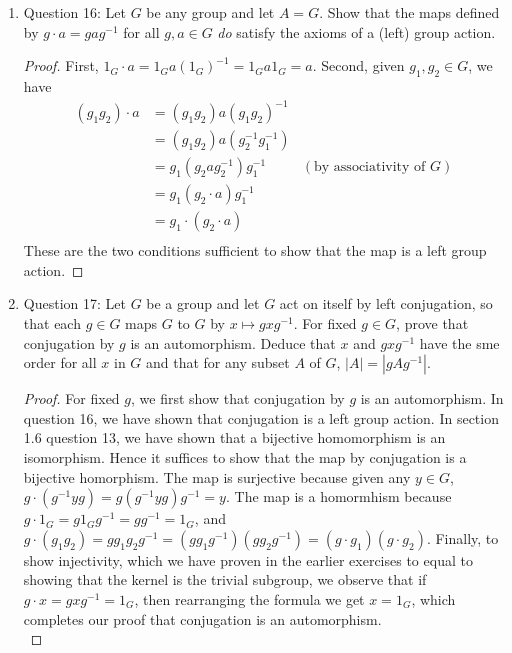 \documentclass{article}
\begin{document}
\begin{enumerate}
\begin{enumerate}
      \item Question 16: Let $G$ be any group and let $A=G$. Show that the
        maps defined by $g\cdot a=gag^{-1}$ for all $g,a\in G$ \textit{do}
        satisfy the axioms of a (left) group action.

        \begin{proof}
          First, $1_G\cdot a=1_Ga(1_G)^{-1}=1_Ga1_G=a$. Second, given
          $g_1,g_2\in G$, we have
          \begin{align*}
            (g_1g_2)\cdot a & = (g_1g_2)a(g_1g_2)^{-1}      & \\
                            & = (g_1g_2)a(g_2^{-1}g_1^{-1}) & \\
                            & = g_1(g_2ag_2^{-1})g_1^{-1}   & (\text{by
                            associativity of $G$}) \\
                            & = g_1(g_2\cdot a)g_1^{-1}     & \\
                            & = g_1\cdot(g_2\cdot a)        & \\
          \end{align*}
          These are the two conditions sufficient to show that the map is a
          left group action. 
        \end{proof}

      \item Question 17: Let $G$ be a group and let $G$ act on itself by
        left conjugation, so that each $g\in G$ maps $G$ to $G$ by
        $x\mapsto gxg^{-1}$. For fixed $g\in G$, prove that conjugation by
        $g$ is an automorphism. Deduce that $x$ and $gxg^{-1}$ have the sme
        order for all $x$ in $G$ and that for any subset $A$ of $G$,
        $|A|=|gAg^{-1}|$.

        \begin{proof}
          For fixed $g$, we first show that conjugation by $g$ is an
          automorphism. In question 16, we have shown that conjugation is a
          left group action. In section 1.6 question 13, we have shown that
          a bijective homomorphism is an isomorphism. Hence it suffices to
          show that the map by conjugation is a bijective homorphism. The
          map is surjective because given any $y\in G$, $g\cdot
          (g^{-1}yg)=g(g^{-1}yg)g^{-1}=y$. The map is a homormhism because
          $g\cdot 1_G=g1_Gg^{-1}=gg^{-1}=1_G$, and
          $g\cdot(g_1g_2)=gg_1g_2g^{-1}=(gg_1g^{-1})(gg_2g^{-1})=(g\cdot
          g_1)(g\cdot g_2)$. Finally, to show injectivity, which we have
          proven in the earlier exercises to equal to showing that the
          kernel is the trivial subgroup, we observe that if $g\cdot
          x=gxg^{-1}=1_G$, then rearranging the formula we get $x=1_G$,
          which completes our proof that conjugation is an automorphism. \\


\end{proof}
\end{enumerate}
\end{enumerate}
\end{document}
